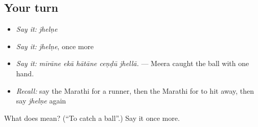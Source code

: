 \subsection*{Your turn}
\begin{itemize}
\raggedright
  \item \emph{Say it:} \emph{jhelṇe}
  \item \emph{Say it:} \emph{jhelṇe}, once more
  \item \emph{Say it:} \emph{mīrāne ekā hātāne ceṇḍū jhellā.} — Meera caught the ball with one hand.
  \item \emph{Recall:} say the Marathi for a runner, then the Marathi for to hit away, then say \emph{jhelṇe} again
\end{itemize}

\begin{tcolorbox}[breakable,colback=teal!4,colframe=teal!35!black,title={Before you move on}]
What does  mean? (\textquotedblleft{}To catch a ball\textquotedblright{}.) Say it once more.
\end{tcolorbox}
